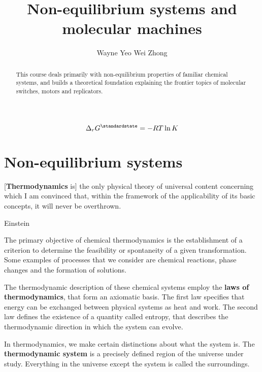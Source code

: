 \documentclass{article}
\title{Non-equilibrium systems and molecular machines}
\author{Wayne Yeo Wei Zhong}
\numberwithin{theorem}{section}
\numberwithin{corollary}{section}
\numberwithin{postulate}{section}
\numberwithin{lemma}{section}
\numberwithin{definition}{section}
\begin{document}
\maketitle

\begin{abstract}
  This course deals primarily with non-equilibrium properties of familiar
  chemical systems, and builds a theoretical foundation explaining the frontier
  topics of molecular switches, motors and replicators.
\end{abstract}

\tableofcontents

\newpage

\section*{}
\bigskip

\begin{equation*}
  \Delta_r G^{\standardstate} = -RT\ln{K}
\end{equation*}

\newpage

\part{Non-equilibrium systems}

\epigraph{[\textbf{Thermodynamics} is] the only physical theory of universal
content concerning which I am convinced that, within the framework of the
applicability of its basic concepts, it will never be overthrown.}{Einstein}

The primary objective of chemical thermodynamics is the establishment of a
criterion to determine the feasibility or spontaneity of a given
transformation. Some examples of processes that we consider are chemical
reactions, phase changes and the formation of solutions. 

The thermodynamic description of these chemical systems employ the \textbf{laws
of thermodynamics}, that form an axiomatic basis. The first law specifies that
energy can be exchanged between physical systems as heat and work.
The second law defines the existence of a quantity called entropy, that
describes the thermodynamic direction in which the system can evolve.

In thermodynamics, we make certain distinctions about what the system is. The
\textbf{thermodynamic system} is a precisely defined region of the universe
under study. Everything in the universe except the system is called the
surroundings.
\end{document}
